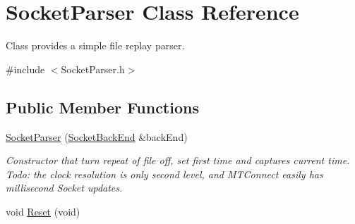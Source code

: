\hypertarget{class_socket_parser}{}\section{Socket\+Parser Class Reference}
\label{class_socket_parser}


Class provides a simple file replay parser.  




{\ttfamily \#include $<$Socket\+Parser.\+h$>$}

\subsection*{Public Member Functions}
\begin{DoxyCompactItemize}
\item 
\hypertarget{class_socket_parser_ad5c4798924ba150c3ad51d0368cfe721}{}\hyperlink{class_socket_parser_ad5c4798924ba150c3ad51d0368cfe721}{Socket\+Parser} (\hyperlink{class_socket_back_end}{Socket\+Back\+End} \&back\+End)\label{class_socket_parser_ad5c4798924ba150c3ad51d0368cfe721}

\begin{DoxyCompactList}\small\item\em Constructor that turn repeat of file off, set first time and captures current time. Todo\+: the clock resolution is only second level, and M\+T\+Connect easily has millisecond Socket updates. \end{DoxyCompactList}\item 
\hypertarget{class_socket_parser_a755c7d07e7ac04c609456118c53fe85d}{}void \hyperlink{class_socket_parser_a755c7d07e7ac04c609456118c53fe85d}{Reset} (void)\label{class_socket_parser_a755c7d07e7ac04c609456118c53fe85d}


\end{DoxyCompactItemize}
